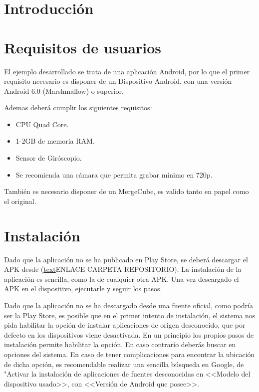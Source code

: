 
\section{Introducción}

\section{Requisitos de usuarios}
 El ejemplo desarrollado se trata de una aplicación Android, por lo que el primer requisito necesario es disponer de un Dispositivo Android, con una versión Android 6.0 (Marshmallow) o superior.
  
 Ademas deberá cumplir los siguientes requisitos\cite{vuforia_devices}:
 \begin{itemize}
 	\item CPU Quad Core.
 	\item 1-2GB de memoria RAM.
 	\item Sensor de Giróscopio.
 	\item Se recomienda una cámara que permita grabar mínimo en 720p.  
 \end{itemize}
También es necesario disponer de un MergeCube, es valido tanto en papel como el original. 
\section{Instalación}

Dado que la aplicación no se ha publicado en Play Store, se deberá descargar el APK desde (\href{URL}{text}ENLACE CARPETA REPOSITORIO).
La instalación de la aplicación es sencilla, como la de cualquier otra APK. Una vez descargado el APK en el dispositivo, ejecutarle y seguir los pasos. 

Dado que la aplicación no se ha descargado desde una fuente oficial, como podría ser la Play Store, es posible que en el primer intento de instalación, el sistema nos pida habilitar la opción de instalar aplicaciones de origen desconocido, que por defecto en los dispositivos viene desactivada.
En un principio los propios pasos de instalación permite habilitar la opción. En caso contrarío deberás buscar en opciones del sistema. En caso de tener complicaciones para encontrar la ubicación de dicha opción, es recomendable realizar una sencilla búsqueda en Google, de "Activar la instalación de aplicaciones de fuentes desconocidas en <<Modelo del dispositivo usado>>, con <<Versión de Android que posee>>.


